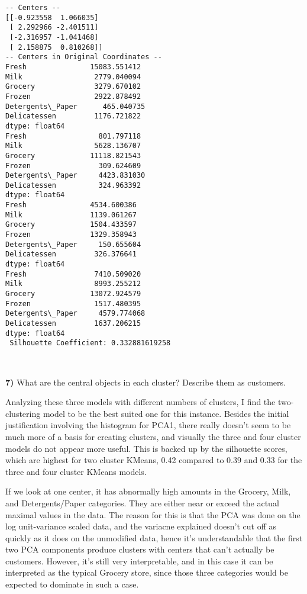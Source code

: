 \documentclass{article}
\begin{document}
    \begin{Verbatim}[commandchars=\\\{\}]
-- Centers --
[[-0.923558  1.066035]
 [ 2.292966 -2.401511]
 [-2.316957 -1.041468]
 [ 2.158875  0.810268]]
-- Centers in Original Coordinates --
Fresh               15083.551412
Milk                 2779.040094
Grocery              3279.670102
Frozen               2922.878492
Detergents\_Paper      465.040735
Delicatessen         1176.721822
dtype: float64
Fresh                 801.797118
Milk                 5628.136707
Grocery             11118.821543
Frozen                309.624609
Detergents\_Paper     4423.831030
Delicatessen          324.963392
dtype: float64
Fresh               4534.600386
Milk                1139.061267
Grocery             1504.433597
Frozen              1329.358943
Detergents\_Paper     150.655604
Delicatessen         326.376641
dtype: float64
Fresh                7410.509020
Milk                 8993.255212
Grocery             13072.924579
Frozen               1517.480395
Detergents\_Paper     4579.774068
Delicatessen         1637.206215
dtype: float64
 Silhouette Coefficient: 0.332881619258
    \end{Verbatim}

    \begin{center}
    \end{center}
    { \hspace*{\fill} \\}
    
    \textbf{7)} What are the central objects in each cluster? Describe them
as customers.

    Analyzing these three models with different numbers of clusters, I find
the two-clustering model to be the best suited one for this instance.
Besides the initial justification involving the histogram for PCA1,
there really doesn't seem to be much more of a basis for creating
clusters, and visually the three and four cluster models do not appear
more useful. This is backed up by the silhouette scores, which are
highest for two cluster KMeans, 0.42 compared to 0.39 and 0.33 for the
three and four cluster KMeans models.

If we look at one center, it has abnormally high amounts in the Grocery,
Milk, and Detergents/Paper categories. They are either near or exceed
the actual maximal values in the data. The reason for this is that the
PCA was done on the log unit-variance scaled data, and the variacne
explained doesn't cut off as quickly as it does on the unmodified data,
hence it's understandable that the first two PCA components produce
clusters with centers that can't actually be customers. However, it's
still very interpretable, and in this case it can be interpreted as the
typical Grocery store, since those three categories would be expected to
dominate in such a case.
\end{document}
